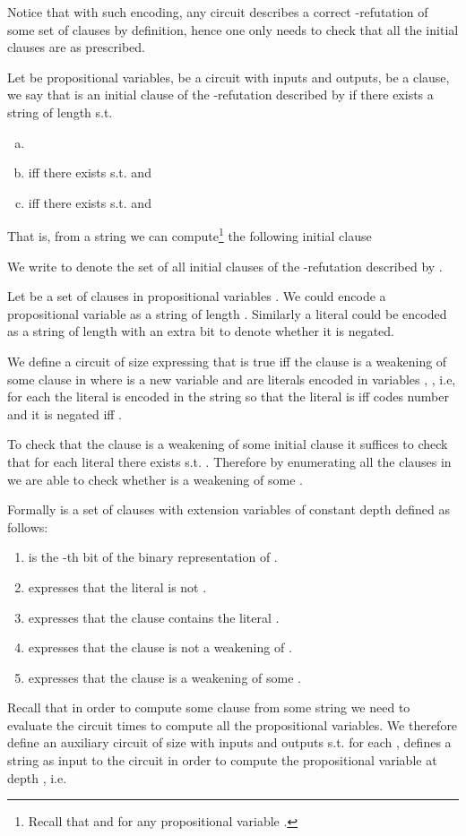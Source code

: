 \documentclass{LMCS}
\theoremstyle{plain}\newtheorem{satz}[thm]{Satz}
\begin{document}
Notice that with such encoding, any circuit describes a correct -refutation of some set of clauses by definition, hence one only needs to check that all the initial clauses are as prescribed.

Let  be propositional variables,  be a circuit with  inputs and  outputs,  be a clause, we say that  is an initial clause of the -refutation described by  if there exists a string  of length  s.t.
\begin{enumerate}[(a)]
\item

\item
 iff there exists  s.t.  and 
\item
 iff there exists  s.t.  and 
\end{enumerate}
That is, from a string  we can compute\footnote{Recall that  and  for any propositional variable .} the following initial clause 

We write  to denote the set of all initial clauses of the -refutation described by .

Let  be a set of clauses in  propositional variables . We could encode a propositional variable as a string of length . Similarly a literal could be encoded as a string of length  with an extra bit to denote whether it is negated.

We define a circuit  of size  expressing that  is true iff the clause  is a weakening of some clause in  where  is a new variable and  are literals encoded in variables , , i.e, for each   the literal  is encoded in the string  so that the literal  is  iff  codes number  and it is negated iff .

To check that the clause  is a weakening of some initial clause  it suffices to check that for each literal  there exists  s.t. . Therefore by enumerating all the clauses in  we are able to check whether  is a weakening of some .

Formally  is a set of clauses with extension variables of constant depth defined as follows:
\begin{enumerate}[]
\item
 is the -th bit of the binary representation of .
\item
 expresses that the literal  is not .
\item
 expresses that the clause  contains the literal .
\item
 expresses that the clause  is not a weakening of .
\item
 expresses that the clause  is a weakening of some .
\end{enumerate}
Recall that in order to compute some clause  from some string  we need to evaluate the circuit   times to compute all the propositional variables. We therefore define an auxiliary circuit  of size  with inputs  and outputs  s.t. for each ,  defines a string as input to the circuit  in order to compute the propositional variable at depth , i.e.
\end{document}
